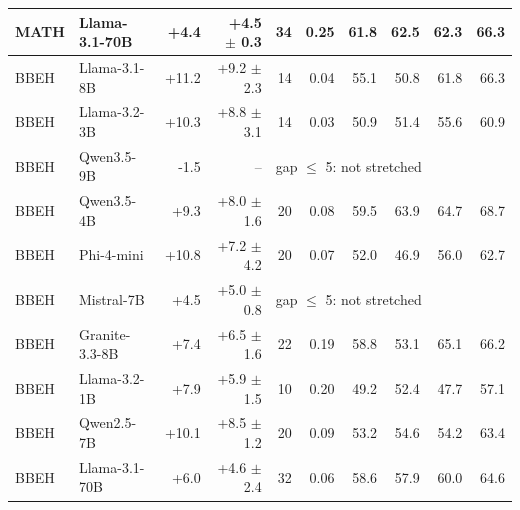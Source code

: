 \begin{tabular}{ll rr rr rrrr}
MATH & Llama-3.1-70B & +4.4 & +4.5 $\pm$ 0.3 & 34 & 0.25 & 61.8 & 62.5 & 62.3 & 66.3 \\
\midrule
BBEH & Llama-3.1-8B & +11.2 & +9.2 $\pm$ 2.3 & 14 & 0.04 & 55.1 & 50.8 & 61.8 & 66.3 \\
BBEH & Llama-3.2-3B & +10.3 & +8.8 $\pm$ 3.1 & 14 & 0.03 & 50.9 & 51.4 & 55.6 & 60.9 \\
BBEH & Qwen3.5-9B & -1.5 & -- & \multicolumn{6}{l}{gap $\le$ 5: not stretched} \\
BBEH & Qwen3.5-4B & +9.3 & +8.0 $\pm$ 1.6 & 20 & 0.08 & 59.5 & 63.9 & 64.7 & 68.7 \\
BBEH & Phi-4-mini & +10.8 & +7.2 $\pm$ 4.2 & 20 & 0.07 & 52.0 & 46.9 & 56.0 & 62.7 \\
BBEH & Mistral-7B & +4.5 & +5.0 $\pm$ 0.8 & \multicolumn{6}{l}{gap $\le$ 5: not stretched} \\
BBEH & Granite-3.3-8B & +7.4 & +6.5 $\pm$ 1.6 & 22 & 0.19 & 58.8 & 53.1 & 65.1 & 66.2 \\
BBEH & Llama-3.2-1B & +7.9 & +5.9 $\pm$ 1.5 & 10 & 0.20 & 49.2 & 52.4 & 47.7 & 57.1 \\
BBEH & Qwen2.5-7B & +10.1 & +8.5 $\pm$ 1.2 & 20 & 0.09 & 53.2 & 54.6 & 54.2 & 63.4 \\
BBEH & Llama-3.1-70B & +6.0 & +4.6 $\pm$ 2.4 & 32 & 0.06 & 58.6 & 57.9 & 60.0 & 64.6 \\
\bottomrule
\end{tabular}
